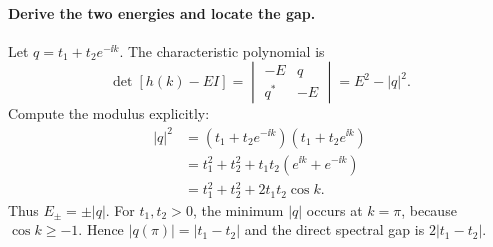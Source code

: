 \paragraph{Derive the two energies and locate the gap.}
Let $q=t_1+t_2e^{-\ii k}$. The characteristic polynomial is
\begin{equation}
\det[h(k)-EI]
=\begin{vmatrix}-E&q\\q^*&-E\end{vmatrix}
=E^2-|q|^2.
\end{equation}
Compute the modulus explicitly:
\begin{equation}
\begin{aligned}
|q|^2
&=(t_1+t_2e^{-\ii k})(t_1+t_2e^{\ii k})\\
&=t_1^2+t_2^2+t_1t_2(e^{\ii k}+e^{-\ii k})\\
&=t_1^2+t_2^2+2t_1t_2\cos k.
\end{aligned}
\end{equation}
Thus $E_\pm=\pm|q|$. For $t_1,t_2>0$,
the minimum $|q|$ occurs at $k=\pi$, because
$\cos k\geq-1$. Hence
$|q(\pi)|=|t_1-t_2|$ and
the direct spectral gap is $2|t_1-t_2|$.

